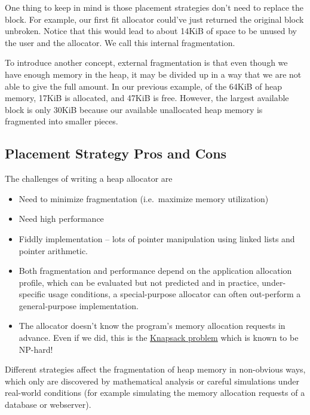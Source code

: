 One thing to keep in mind is those placement strategies don't need to replace the block.
For example, our first fit allocator could've just returned the original block unbroken.
Notice that this would lead to about 14KiB of space to be unused by the user and the allocator.
We call this internal fragmentation.

To introduce another concept, external fragmentation is that even though we have enough memory in the heap, it may be divided up in a way that we are not able to give the full amount.
In our previous example, of the 64KiB of heap memory, 17KiB is allocated, and 47KiB is free.
However, the largest available block is only 30KiB because our available unallocated heap memory is fragmented into smaller pieces.

\subsection{Placement Strategy Pros and Cons}

The challenges of writing a heap allocator are
\begin{itemize}
\item Need to minimize fragmentation (i.e.~maximize memory utilization)
\item Need high performance
\item Fiddly implementation -- lots of pointer manipulation using linked lists and pointer arithmetic.
\item Both fragmentation and performance depend on the application allocation profile, which can be evaluated but not predicted and in practice, under-specific usage conditions, a special-purpose allocator can often out-perform a general-purpose implementation.
\item The allocator doesn't know the program's memory allocation requests in advance. Even if we did, this is the \href{http://en.wikipedia.org/wiki/Knapsack_problem}{Knapsack problem} which is known to be NP-hard!
\end{itemize}

Different strategies affect the fragmentation of heap memory in non-obvious ways, which only are discovered by mathematical analysis or careful simulations under real-world conditions (for example simulating the memory allocation requests of a database or webserver).

